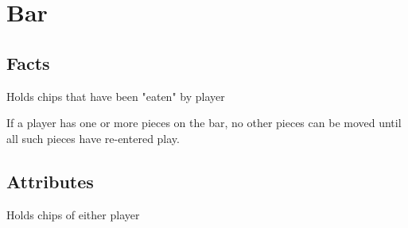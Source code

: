 \section{Bar}

\subsection{Facts}

\begin{dashed}
	\item Holds chips that have been "eaten" by player
	\item If a player has one or more pieces on the bar,
      no other pieces can be moved until all such pieces
      have re-entered play.
\end{dashed}

\subsection{Attributes}
\begin{dashed}
	\item Holds chips of either player
\end{dashed}

